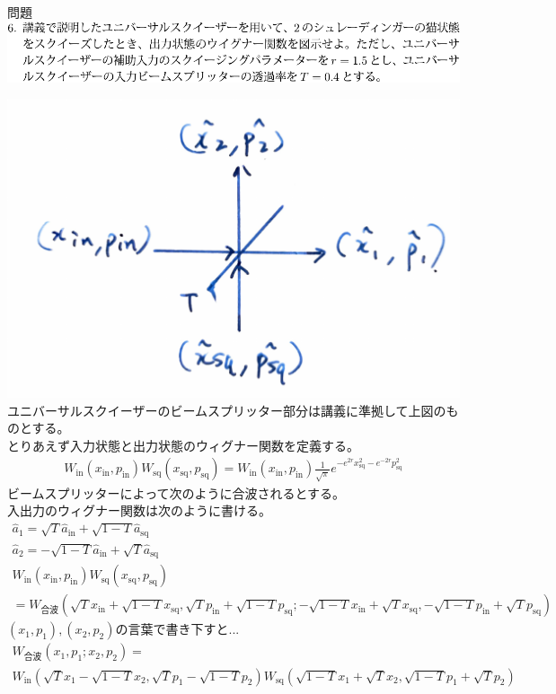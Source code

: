 \documentclass{jsarticle}
\newcommand{\mr}[1]{\mathrm{#1}}
\begin{document}
\newpage
\begin{itembox}[l]{問題}
	\vspace*{-0mm}
	\centering
	\includegraphics[width=1\linewidth]{./graphics/6.pdf}
\end{itembox}

\includegraphics[width=0.5\linewidth]{./graphics/HBS.pdf}\\
ユニバーサルスクイーザーのビームスプリッター部分は講義に準拠して上図のものとする。\\
とりあえず入力状態と出力状態のウィグナー関数を定義する。
\begin{gather*}
	W_\mr{in}(x_\mr{in},p_\mr{in})W_\mr{sq}(x_\mr{sq}, p_\mr{sq})
	=
	W_\mr{in}(x_\mr{in},p_\mr{in})\frac{1}{\sqrt{\pi}} e^{-e^{2r}x_\mr{sq}^2 - e^{-2r}p_\mr{sq}^2}
\end{gather*}
ビームスプリッターによって次のように合波されるとする。\\
入出力のウィグナー関数は次のように書ける。
\begin{gather*}
	\hat{a}_1 = \sqrt{T} \hat{a}_\mr{in} + \sqrt{1-T} \hat{a}_\mr{sq}\\
	\hat{a}_2 = -\sqrt{1-T}\hat{a}_\mr{in} + \sqrt{T} \hat{a}_\mr{sq}\\
	W_\mr{in}(x_\mr{in},p_\mr{in})W_\mr{sq}(x_\mr{sq}, p_\mr{sq})\\
	= W_\text{合波}(\sqrt{T} x_\mr{in} + \sqrt{1-T} x_\mr{sq}, \sqrt{T} p_\mr{in} + \sqrt{1-T} p_\mr{sq}; -\sqrt{1-T}x_\mr{in} + \sqrt{T} x_\mr{sq}, -\sqrt{1-T}p_\mr{in} + \sqrt{T} p_\mr{sq})
\end{gather*}
$(x_1,p_1),(x_2,p_2)$の言葉で書き下すと...
\begin{gather*}
	W_\text{合波}(x_1,p_1; x_2,p_2)
	=\\
	W_\mr{in}(\sqrt{T}x_1 - \sqrt{1-T}x_2,\sqrt{T}p_1 - \sqrt{1-T}p_2)
	W_\mr{sq}(\sqrt{1-T} x_1 + \sqrt{T} x_2 ,  \sqrt{1-T} p_1 + \sqrt{T} p_2 )
\end{gather*}\\
\end{document}
